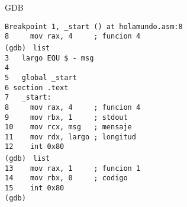 \documentclass[aspectratio=169]{beamer}
\begin{document}
\begin{frame}[fragile,t]{GDB}
    \hspace{3cm}
    \begin{minipage}{10cm}
    \vspace{-0.5cm}
    \scriptsize
    \verb|Breakpoint 1, _start () at holamundo.asm:8|\\
    \verb|8	    mov rax, 4     ; funcion 4 |\\
    \vspace{0.1cm}
    \verb|(gdb) | \pause \verb|list|\\
    \pause
    \vspace{0.1cm}
    \verb|3   largo EQU $ - msg            |\\
    \verb|4                                |\\
    \verb|5   global _start                |\\
    \verb|6 section .text                  |\\
    \verb|7   _start:                      |\\
    \verb|8     mov rax, 4     ; funcion 4 |\\
    \verb|9     mov rbx, 1     ; stdout    |\\
    \verb|10    mov rcx, msg   ; mensaje  |\\ 
    \verb|11    mov rdx, largo ; longitud  |\\
    \verb|12    int 0x80                   |\\
    \vspace{0.1cm}
    \verb|(gdb) | \pause \verb|list|\\
    \pause
    \vspace{0.1cm}
    \verb|13    mov rax, 1     ; funcion 1 |\\
    \verb|14    mov rbx, 0     ; codigo    |\\
    \verb|15    int 0x80                   |\\
    \verb|(gdb) |\\
    \end{minipage}
\end{frame}
\end{document}
